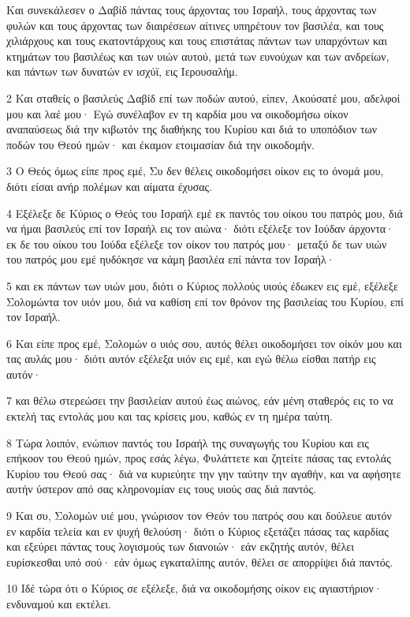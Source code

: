 \par Και συνεκάλεσεν ο Δαβίδ πάντας τους άρχοντας του Ισραήλ, τους άρχοντας των φυλών και τους άρχοντας των διαιρέσεων αίτινες υπηρέτουν τον βασιλέα, και τους χιλιάρχους και τους εκατοντάρχους και τους επιστάτας πάντων των υπαρχόντων και κτημάτων του βασιλέως και των υιών αυτού, μετά των ευνούχων και των ανδρείων, και πάντων των δυνατών εν ισχύϊ, εις Ιερουσαλήμ.
\par 2 Και σταθείς ο βασιλεύς Δαβίδ επί των ποδών αυτού, είπεν, Ακούσατέ μου, αδελφοί μου και λαέ μου· Εγώ συνέλαβον εν τη καρδία μου να οικοδομήσω οίκον αναπαύσεως διά την κιβωτόν της διαθήκης του Κυρίου και διά το υποπόδιον των ποδών του Θεού ημών· και έκαμον ετοιμασίαν διά την οικοδομήν.
\par 3 Ο Θεός όμως είπε προς εμέ, Συ δεν θέλεις οικοδομήσει οίκον εις το όνομά μου, διότι είσαι ανήρ πολέμων και αίματα έχυσας.
\par 4 Εξέλεξε δε Κύριος ο Θεός του Ισραήλ εμέ εκ παντός του οίκου του πατρός μου, διά να ήμαι βασιλεύς επί τον Ισραήλ εις τον αιώνα· διότι εξέλεξε τον Ιούδαν άρχοντα· εκ δε του οίκου του Ιούδα εξέλεξε τον οίκον του πατρός μου· μεταξύ δε των υιών του πατρός μου εμέ ηυδόκησε να κάμη βασιλέα επί πάντα τον Ισραήλ·
\par 5 και εκ πάντων των υιών μου, διότι ο Κύριος πολλούς υιούς έδωκεν εις εμέ, εξέλεξε Σολομώντα τον υιόν μου, διά να καθίση επί τον θρόνον της βασιλείας του Κυρίου, επί τον Ισραήλ.
\par 6 Και είπε προς εμέ, Σολομών ο υιός σου, αυτός θέλει οικοδομήσει τον οίκόν μου και τας αυλάς μου· διότι αυτόν εξέλεξα υιόν εις εμέ, και εγώ θέλω είσθαι πατήρ εις αυτόν·
\par 7 και θέλω στερεώσει την βασιλείαν αυτού έως αιώνος, εάν μένη σταθερός εις το να εκτελή τας εντολάς μου και τας κρίσεις μου, καθώς εν τη ημέρα ταύτη.
\par 8 Τώρα λοιπόν, ενώπιον παντός του Ισραήλ της συναγωγής του Κυρίου και εις επήκοον του Θεού ημών, προς εσάς λέγω, Φυλάττετε και ζητείτε πάσας τας εντολάς Κυρίου του Θεού σας· διά να κυριεύητε την γην ταύτην την αγαθήν, και να αφήσητε αυτήν ύστερον από σας κληρονομίαν εις τους υιούς σας διά παντός.
\par 9 Και συ, Σολομών υιέ μου, γνώρισον τον Θεόν του πατρός σου και δούλευε αυτόν εν καρδία τελεία και εν ψυχή θελούση· διότι ο Κύριος εξετάζει πάσας τας καρδίας και εξεύρει πάντας τους λογισμούς των διανοιών· εάν εκζητής αυτόν, θέλει ευρίσκεσθαι υπό σού· εάν όμως εγκαταλίπης αυτόν, θέλει σε απορρίψει διά παντός.
\par 10 Ιδέ τώρα ότι ο Κύριος σε εξέλεξε, διά να οικοδομήσης οίκον εις αγιαστήριον· ενδυναμού και εκτέλει.
